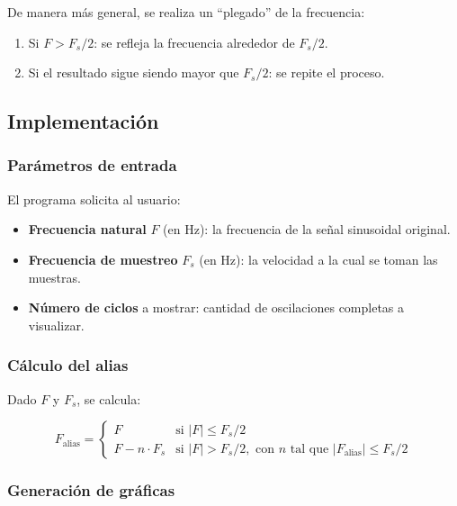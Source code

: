 \documentclass[12pt]{article}
\begin{document}
De manera más general, se realiza un ``plegado'' de la frecuencia:
 
\begin{enumerate}
	\item Si $F > F_s/2$: se refleja la frecuencia alrededor de $F_s/2$.
	\item Si el resultado sigue siendo mayor que $F_s/2$: se repite el proceso.
\end{enumerate}
 
\subsection*{Implementación}
 
\subsubsection*{Parámetros de entrada}
 
El programa solicita al usuario:
 
\begin{itemize}
	\item \textbf{Frecuencia natural} $F$ (en Hz): la frecuencia de la señal sinusoidal original.
	\item \textbf{Frecuencia de muestreo} $F_s$ (en Hz): la velocidad a la cual se toman las muestras.
	\item \textbf{Número de ciclos} a mostrar: cantidad de oscilaciones completas a visualizar.
\end{itemize}
 
\subsubsection*{Cálculo del alias}
 
Dado $F$ y $F_s$, se calcula:
 
\begin{equation}
F_{\text{alias}} = \begin{cases}
F & \text{si } |F| \leq F_s/2 \\
F - n \cdot F_s & \text{si } |F| > F_s/2, \text{ con } n \text{ tal que } |F_{\text{alias}}| \leq F_s/2
\end{cases}
\end{equation}
 
\subsubsection*{Generación de gráficas}
 
\end{document}
